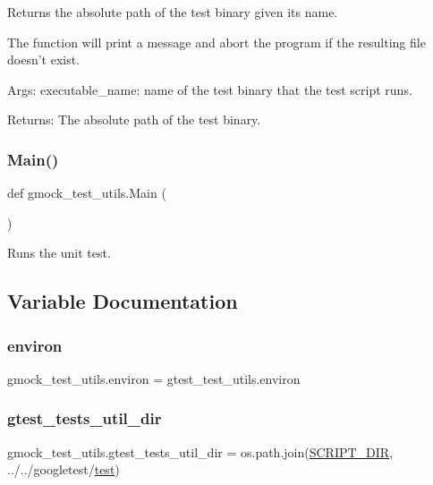 \begin{DoxyVerb}Returns the absolute path of the test binary given its name.

The function will print a message and abort the program if the resulting file
doesn't exist.

Args:
  executable_name: name of the test binary that the test script runs.

Returns:
  The absolute path of the test binary.
\end{DoxyVerb}
 \mbox{\label{namespacegmock__test__utils_ad79dc6aea3727ee23b5f5c454ef0d78a}} 
\subsubsection{\texorpdfstring{Main()}{Main()}}
{\footnotesize\ttfamily def gmock\+\_\+test\+\_\+utils.\+Main (\begin{DoxyParamCaption}{ }\end{DoxyParamCaption})}

\begin{DoxyVerb}Runs the unit test.\end{DoxyVerb}
 

\subsection{Variable Documentation}
\mbox{\label{namespacegmock__test__utils_a6f0938b5e8839ebc847b52a38f4d35e3}} 
\subsubsection{\texorpdfstring{environ}{environ}}
{\footnotesize\ttfamily gmock\+\_\+test\+\_\+utils.\+environ = gtest\+\_\+test\+\_\+utils.\+environ}

\mbox{\label{namespacegmock__test__utils_af6d94170502149e7f99cfa73ddc13c00}} 
\subsubsection{\texorpdfstring{gtest\_tests\_util\_dir}{gtest\_tests\_util\_dir}}
{\footnotesize\ttfamily gmock\+\_\+test\+\_\+utils.\+gtest\+\_\+tests\+\_\+util\+\_\+dir = os.\+path.\+join(\mbox{\hyperlink{namespacegmock__test__utils_a4ef94affd9d889f78d67be80017eeddd}{S\+C\+R\+I\+P\+T\+\_\+\+D\+IR}}, \textquotesingle{}../../googletest/\mbox{\hyperlink{_mutual_8h_a707ee03719e99670bf6cfdfd897b8456}{test}}\textquotesingle{})}

